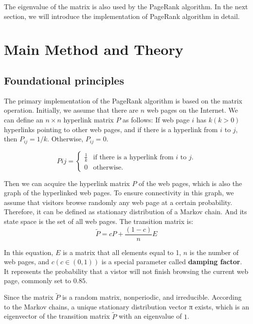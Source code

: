 \documentclass[lettersize,journal,12pt,conference]{IEEEtran}
\begin{document}
The eigenvalue of the matrix is also used by the PageRank algorithm. In the next section, we will introduce the implementation of PageRank algorithm in detail.

\section{Main Method and Theory}

\subsection{Foundational principles}

The primary implementation of the PageRank algorithm is based on the matrix operation\cite{ref0}.
Initially, we assume that there are $n$ web pages on the Internet. We can define an $n \times n$ hyperlink matrix $P$ as follows: If web page $i$ has $k (k > 0)$ hyperlinks pointing to other web pages, and if there is a hyperlink from $i$ to $j$, then $P_{ij} = 1/k$. Otherwise, $P_{ij} = 0$.

\begin{equation}
	\label{eq:1}
	Pij =
	\begin{cases}
		\frac{1}{k} & \text{if there is a hyperlink from $i$ to $j$.} \\
		0           & \text{otherwise.}
	\end{cases}
\end{equation}

Then we can acquire the hyperlink matrix $P$ of the web pages, which is also the graph of the hyperlinked web pages.
To ensure connectivity in this graph, we assume that visitors browse randomly any web page at a certain probability. Therefore, it can be defined as stationary distribution of a Markov chain. And its state space is the set of all web pages. The transition matrix is:
\begin{equation}
	\label{eq:2}
	\widetilde{P} = cP + \frac{(1 - c)}{n}E
\end{equation}

In this equation, $E$ is a matrix that all elements equal to 1, $n$ is the number of web pages, and \(c (c \in (0,1))\) is a special parameter called \textbf{damping factor}. It represents the probability that a vistor will not finish browsing the current web page, commonly set to $0.85$\cite{ref4}.

Since the matrix $\widetilde{P}$ is a random matrix, nonperiodic, and irreducible. According to the Markov chains\cite{ref5}, a unique stationary distribution vector π exists, which is an eigenvector of the transition matrix $\widetilde{P}$ with an eigenvalue of $1$\cite{ref6}.
\end{document}
